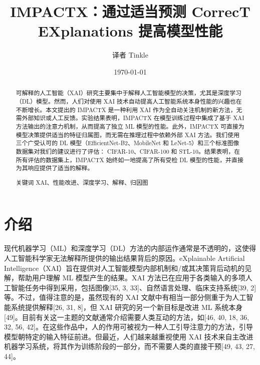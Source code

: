 \documentclass[12pt, a4paper]{ctexart} %
\title{IMPACTX：通过适当预测 CorrecT EXplanations 提高模型性能}
\author{译者    Tinkle}
\date{\today}
\begin{document}
\maketitle{}
\begin{abstract}
    可解释的人工智能（XAI）研究主要集中于解释人工智能模型的决策，尤其是深度学习（DL）模型。然而，人们对使用 XAI 技术自动提高人工智能系统本身性能的兴趣也在不断增长。本文提出的 IMPACTX 是一种利用 XAI 作为全自动关注机制的新方法，无需外部知识或人工反馈。实验结果表明，IMPACTX 在模型训练过程中集成了基于 XAI 方法输出的注意力机制，从而提高了独立 ML 模型的性能。此外，IMPACTX 可直接为模型决策提供适当的特征归属图，而无需在推理过程中依赖外部 XAI 方法。我们使用三个广受认可的 DL 模型（EfficientNet-B2、MobileNet 和 LeNet-5）和三个标准图像数据集对我们的建议进行了评估： CIFAR-10、CIFAR-100 和 STL-10。结果表明，在所有评估的数据集上，IMPACTX 始终如一地提高了所有受检 DL 模型的性能，并直接为其响应提供了适当的解释。
    
    关键词 XAI、性能改进、深度学习、解释、归因图
\end{abstract}

\section{介绍}
现代机器学习（ML）和深度学习（DL）方法的内部运作通常是不透明的，这使得人工智能科学家无法解释所提供的输出结果背后的原因。eXplainable Artificial Intelligence（XAI）旨在提供对人工智能模型内部机制和/或其决策背后动机的见解，帮助用户理解 ML 模型产生的结果。XAI 方法已在应用于各类输入的多项人工智能任务中得到采用，包括图像[35, 3, 33]、自然语言处理、临床支持系统[39, 2]等。不过，值得注意的是，虽然现有的 XAI 文献中有相当一部分侧重于为人工智能系统提供解释[26, 31, 8]，但 XAI 研究的另一个新目标是改进 ML 系统本身[49]。目前有关这一主题的文献通常介绍需要人类互动的方法，如[46, 40, 18, 36, 32, 56, 42]。在这些作品中，人的作用可被视为一种人工引导注意力的方法，引导模型朝特定的输入特征前进。但最近，人们越来越重视使用 XAI 技术来自主改进机器学习系统，将其作为训练阶段的一部分，而不需要人类的直接干预[49, 43, 27, 44]。
\end{document}
